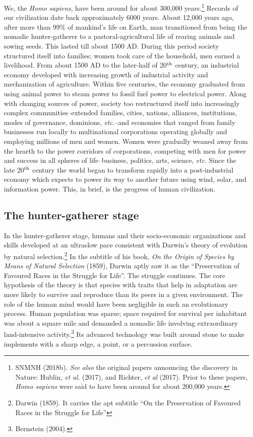 \begin{multicols}{2}
We, the \textit{Homo sapiens}, have been around for about 300,000 years.\footnote{SNMNH (2018b). \textit{See also} the original papers announcing the discovery in Nature: Hublin, \textit{et al.} (2017), and Richter, \textit{et al} (2017). Prior to these papers, \textit{Homo sapiens} were said to have been around for about 200,000 years.} Records of our civilization date back approximately 6000 years. About 12,000 years ago, after more than 99\% of mankind's life on Earth, man transitioned from being the nomadic hunter-gatherer to a pastoral-agricultural life of rearing animals and sowing seeds. This lasted till about 1500 AD. During this period society structured itself into families; women took care of the household, men earned a livelihood. From about 1500 AD to the later-half of 20$^{\rm th}$ century, an industrial economy developed with increasing growth of industrial activity and mechanization of agriculture. Within five centuries, the economy graduated from using animal power to steam power to fossil fuel power to electrical power. Along with changing sources of power, society too restructured itself into increasingly complex communities--extended families, cities, nations, alliances, institutions, modes of governance, dominions, \textit{etc.}--and economies that ranged from family businesses run locally to multinational corporations operating globally and employing millions of men and women. Women were gradually weaned away from the hearth to the power corridors of corporations, competing with men for power and success in all spheres of life--business, politics, arts, science, \textit{etc.} Since the late 20$^{\rm th}$ century the world began to transform rapidly into a post-industrial economy which expects to power its way to another future using wind, solar, and information power. This, in brief, is the progress of human civilization.
\vskip -50pt

\subsection*{The hunter-gatherer stage}
\vskip -7pt

In the hunter-gatherer stage, humans and their socio-economic organizations and skills developed at an ultraslow pace consistent with Darwin's theory of evolution by natural selection.\footnote{Darwin (1859). It carries the apt subtitle “On the Preservation of Favoured Races in the Struggle for Life”} In the subtitle of his book, \textit{On the Origin of Species by Means of Natural Selection} (1859), Darwin aptly saw it as the “Preservation of Favoured Races in the Struggle for Life”. The struggle continues. The core hypothesis of the theory is that species with traits that help in adaptation are more likely to survive and reproduce than its peers in a given environment. The role of the human mind would have been negligible in such an evolutionary process. Human population was sparse; space required for survival per inhabitant was about a square mile and demanded a nomadic life involving extraordinary land-intensive activity.\footnote{Bernstein (2004).} Its advanced technology was built around stone to make implements with a sharp edge, a point, or a percussion surface.
\vskip -25pt


\end{multicols}
